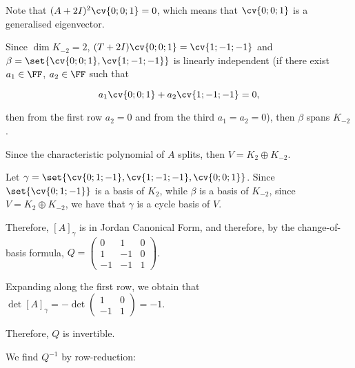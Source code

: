 \documentclass[11pt]{scrartcl}
\begin{document}
\begin{soln}
Note that $(A+2I)^2 \cv{0;0;1}= 0$, which means that $\cv{0;0;1}$ is a generalised eigenvector.

Since $\dim K_{-2} = 2$, $(T+2I)\cv{0;0;1} = \cv{1;-1;-1}$ and
$\beta = \set{\cv{0;0;1},\cv{1;-1;-1}}$ is linearly independent
(if there exist $a_1\in \FF$, $a_2\in\FF$ such that 

\begin{equation*}
a_1\cv{0;0;1}+a_2\cv{1;-1;-1} = 0,
\end{equation*}

then from the first row $a_2= 0$ and from the third $a_1=a_2= 0$), then $\beta$ spans $K_{-2}$.

Since the characteristic polynomial of $A$ splits, then
$V = K_2\oplus K_{-2}$.

Let $\gamma = \set{\cv{0;1;-1}, \cv{1;-1;-1}, \cv{0;0;1}}$. Since
$\set{\cv{0;1;-1}}$ is a basis of $K_2$, while $\beta$ is a basis of
$K_{-2}$, since $V = K_2\oplus K_{-2}$, we have that $\gamma$ is a
cycle basis of $V$.

Therefore, $[A]_{\gamma}$ is in Jordan Canonical Form, and therefore,
by the change-of-basis formula, $Q = 
\begin{pmatrix}
0 & 1 & 0\\
1 & -1 & 0\\
-1 & -1 & 1
\end{pmatrix}$.

Expanding along the first row, we obtain that $\det [A]_{\gamma} = -\det 
\begin{pmatrix}
1 & 0\\
-1  & 1
\end{pmatrix} = -1
$. 

Therefore, $Q$ is invertible.

We find $Q^{-1}$ by row-reduction:


\end{soln}
\end{document}
